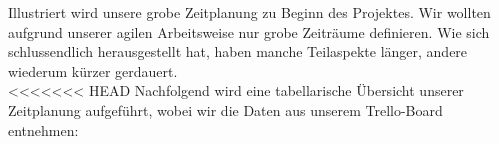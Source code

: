 Illustriert wird unsere grobe Zeitplanung zu Beginn des Projektes. Wir wollten aufgrund unserer agilen Arbeitsweise nur grobe Zeiträume definieren. Wie sich schlussendlich herausgestellt hat, haben manche Teilaspekte länger, andere wiederum kürzer gerdauert.\\



\newpage
<<<<<<< HEAD
Nachfolgend wird eine tabellarische Übersicht unserer Zeitplanung aufgeführt, wobei wir die Daten aus unserem Trello-Board entnehmen:
% 			
% 
% 
